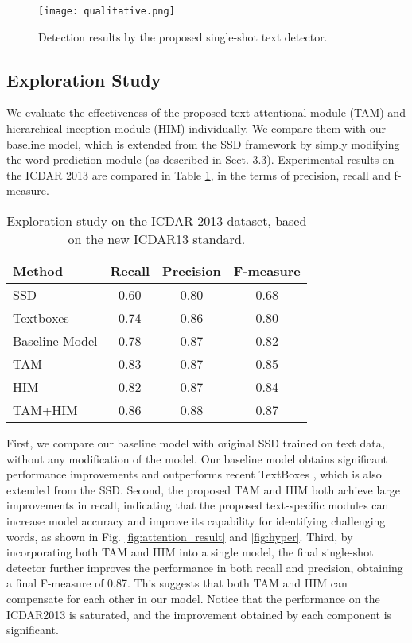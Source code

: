 \documentclass[10pt,twocolumn,letterpaper]{article}
\begin{document}
\begin{figure*}[t!]
\centering     \texttt{[image: qualitative.png]}
   \caption{Detection results by the proposed single-shot text detector. }
   \label{fig:qualitative}
\end{figure*}

\subsection{Exploration Study}
We evaluate the effectiveness of the proposed text attentional module (TAM) and hierarchical inception module (HIM) individually. We compare them with our baseline model, which is extended from the SSD framework by simply modifying the word prediction module (as described in Sect. 3.3).  Experimental results on the ICDAR 2013 are compared in Table \ref{tab:exploration}, in the terms of precision, recall and f-measure.
\begin{table}
\centering
\caption{Exploration study on the ICDAR 2013 dataset, based on the new  ICDAR13 standard.}
\begin{tabular}{|l|c|c|c|}

\hline
Method              &        Recall & Precision & F-measure \\ \hline \hline
SSD~\cite{liu2016SSD}                        & 0.60        & 0.80     & 0.68        \\ \hline
Textboxes~\cite{Liao2017}              & 0.74        & 0.86     & 0.80        \\ \hline \hline
Baseline Model        & 0.78        & 0.87     & 0.82        \\ \hline
TAM & 0.83        & 0.87     & 0.85        \\ \hline
HIM & 0.82        & 0.87     & 0.84        \\ \hline

TAM+HIM &           0.86&     0.88&    0.87 \\ \hline
\end{tabular}
\label{tab:exploration}
\end{table}
First, we compare our baseline model with original SSD trained on text data, without any modification of the model. Our baseline model obtains significant performance improvements and outperforms recent TextBoxes \cite{Liao2017}, which is also extended from the SSD. Second, the proposed TAM and HIM both achieve large improvements in recall, indicating that the proposed text-specific modules can increase model accuracy and improve its capability for identifying challenging words, as shown in Fig. \ref{fig:attention_result} and \ref{fig:hyper}.  Third, by incorporating both TAM and HIM into a single model, the final single-shot detector further improves the performance in both recall and precision, obtaining a final F-measure of 0.87. This suggests that both TAM and HIM can compensate for each other in our model. Notice that the performance on the ICDAR2013 is saturated, and the improvement obtained by each component is significant.
\end{document}
